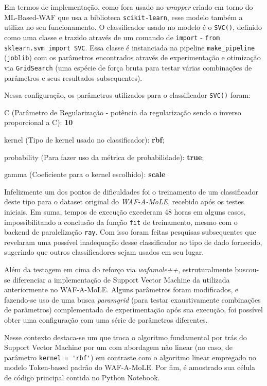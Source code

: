 Em termos de implementação, como fora usado no \textit{wrapper} criado em torno do ML-Based-WAF que usa a biblioteca \verb+scikit-learn+, esse modelo também a utiliza no seu funcionamento. O classificador usado no modelo é o \verb+SVC()+, definido como uma classe e trazido através de um comando de \verb+import+ - \verb+from sklearn.svm import SVC+. Essa classe é instanciada na pipeline \verb+make_pipeline+ (\verb+joblib+) com os parâmetros encontrados através de experimentação e otimização via \verb+GridSearch+ (uma espécie de força bruta para testar várias combinações de parâmetros e seus resultados subsequentes).

Nessa configuração, os parâmetros utilizados para o classificador \verb+SVC()+ foram:
\begin{alineas}
    \item C (Parâmetro de Regularização - potência da regularização sendo o inverso proporcional a C): \textbf{10} 
    \item kernel (Tipo de kernel usado no classificador): \textbf{rbf};
    \item probability (Para fazer uso da métrica de probabilidade): \textbf{true};
    \item gamma (Coeficiente para o kernel escolhido): \textbf{scale}
\end{alineas}

Infelizmente um dos pontos de dificuldades foi o treinamento de um classificador deste tipo para o dataset original do \textit{WAF-A-MoLE}, recebido após os testes iniciais. Em suma, tempos de execução excederam 48 horas em alguns casos, impossibilitando a conclusão da função \verb+fit+ de treinamento, mesmo com o backend de paralelização \verb+ray+.  Com isso foram feitas pesquisas subsequentes que revelaram uma possível inadequação desse classificador ao tipo de dado fornecido, sugerindo que outros classificadores sejam usados em seu lugar.

Além da testagem em cima do reforço via \textit{wafamole++}, estruturalmente buscou-se diferenciar a implementação de Support Vector Machine da utilizada anteriormente no WAF-A-MoLE. Alguns parâmetros foram modificados, e fazendo-se uso de uma busca \textit{paramgrid} (para testar exaustivamente combinações de parâmetros) complementada de experimentação após sua execução, foi possível obter uma configuração com uma série de parâmetros diferentes.

Nesse contexto destaca-se um que troca o algoritmo fundamental por trás do Support Vector Machine por um com abordagem não linear (no caso, de parâmetro \verb+kernel = 'rbf'+) em contraste com o algoritmo linear empregado no modelo Token-based padrão do WAF-A-MoLE. Por fim, é amostrado sua célula de código principal contida no Python Notebook.

